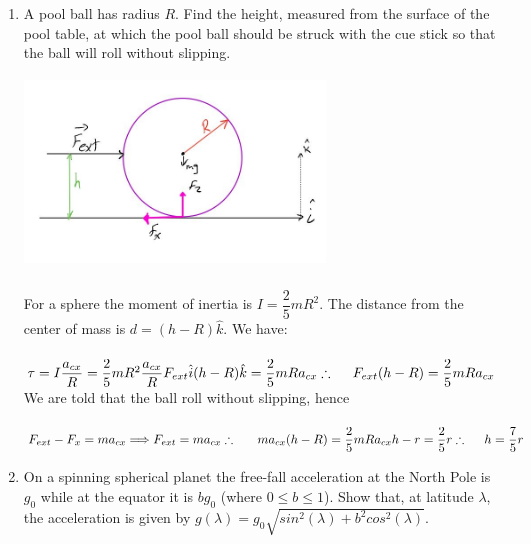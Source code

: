 \documentclass[fleqn]{article}
\begin{document}
\begin{enumerate}
    \item A pool ball has radius $R$. Find the height, measured from the surface of the pool table, at which the pool ball should be struck with the cue
    stick so that the ball will roll without slipping.

      \textcolor{hwColor}{
        \includegraphics[height=5cm, width=8cm]{Capture.JPG}
        \\
        \\
        For a sphere the moment of inertia is $I=\dfrac{2}{5} m R^2$. The distance from the center of mass
        is $d=(h-R)\hat{k}$. We have: \\
        \\
        $
          \tau=I \dfrac{a_{cx}}{R}=\dfrac{2}{5} m R^2 \dfrac{a_{cx}}{R}
          \\
          \\
          F_{ext} \hat{i} (h-R) \hat{k}=\dfrac{2}{5} mRa_{cx} 
          \\
          \\
          \\
          \therefore ~~~~ F_{ext}(h-R)=\dfrac{2}{5} mRa_{cx} 
        $
        We are told that the ball roll without slipping, hence 
        \\
        \\
        $
          F_{ext}-F_{x}=ma_{cx} \Longrightarrow F_{ext}=ma_{cx}
          \\
          \\
          \\
          \therefore ~~~~~ ma_{cx} (h-R)=\dfrac{2}{5} mRa_{cx} 
          \\
          \\
          h-r=\dfrac{2}{5} r
          \\
          \\
          \\
          \therefore ~~~~ h=\dfrac{7}{5} r
        $
      }

    \item On a spinning spherical planet the free-fall acceleration at the North Pole is $g_0$ while at the equator it is $bg_0$ (where $0\leq b\leq 1$). 
    Show that, at latitude $\lambda$, the acceleration is given by $g(\lambda)=g_0 \sqrt{sin^2(\lambda)+b^2 cos^2(\lambda)}$.



\end{enumerate}
\end{document}
